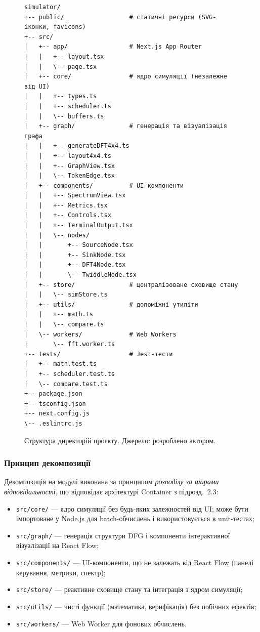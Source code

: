 \begin{figure}[H]
\begin{verbatim}
simulator/
+-- public/                  # статичні ресурси (SVG-іконки, favicons)
+-- src/
|   +-- app/                 # Next.js App Router
|   |   +-- layout.tsx
|   |   \-- page.tsx
|   +-- core/                # ядро симуляції (незалежне від UI)
|   |   +-- types.ts
|   |   +-- scheduler.ts
|   |   \-- buffers.ts
|   +-- graph/               # генерація та візуалізація графа
|   |   +-- generateDFT4x4.ts
|   |   +-- layout4x4.ts
|   |   +-- GraphView.tsx
|   |   \-- TokenEdge.tsx
|   +-- components/          # UI-компоненти
|   |   +-- SpectrumView.tsx
|   |   +-- Metrics.tsx
|   |   +-- Controls.tsx
|   |   +-- TerminalOutput.tsx
|   |   \-- nodes/
|   |       +-- SourceNode.tsx
|   |       +-- SinkNode.tsx
|   |       +-- DFT4Node.tsx
|   |       \-- TwiddleNode.tsx
|   +-- store/               # централізоване сховище стану
|   |   \-- simStore.ts
|   +-- utils/               # допоміжні утиліти
|   |   +-- math.ts
|   |   \-- compare.ts
|   \-- workers/             # Web Workers
|       \-- fft.worker.ts
+-- tests/                   # Jest-тести
|   +-- math.test.ts
|   +-- scheduler.test.ts
|   \-- compare.test.ts
+-- package.json
+-- tsconfig.json
+-- next.config.js
\-- .eslintrc.js
\end{verbatim}
\caption{Структура директорій проєкту. Джерело: розроблено автором.}
\label{fig:project_tree}
\end{figure}

\subsubsection*{Принцип декомпозиції}

Декомпозиція на модулі виконана за принципом \emph{розподілу за
шарами відповідальності}, що відповідає архітектурі Container з
підрозд.~2.3:

\begin{itemize}
  \item \texttt{src/core/} --- ядро симуляції без будь-яких
        залежностей від UI; може бути імпортоване у Node.js для
        batch-обчислень і використовується в unit-тестах;
  \item \texttt{src/graph/} --- генерація структури DFG і компоненти
        інтерактивної візуалізації на React Flow;
  \item \texttt{src/components/} --- UI-компоненти, що не залежать
        від React Flow (панелі керування, метрики, спектр);
  \item \texttt{src/store/} --- реактивне сховище стану та
        інтеграція з ядром симуляції;
  \item \texttt{src/utils/} --- чисті функції (математика, верифікація)
        без побічних ефектів;
  \item \texttt{src/workers/} --- Web Worker для фонових обчислень.
\end{itemize}

